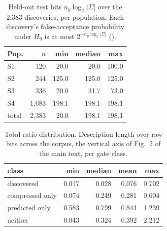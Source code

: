 \begin{table}[!ht]\centering
\caption{Held-out test bits $n_y\log_2|\Sigma|$ over the 2,383 discoveries, per population. Each discovery's false-acceptance probability under $H_0$ is at most $2^{-n_y\log_2|\Sigma|}$ ().}\label{tab:sc6}
\begin{tabular}{lrrrr}\toprule
Pop. & $n$ & min & median & max \\\midrule
S1 & 120 & 20.0 & 20.0 & 100.0 \\
S2 & 244 & 125.0 & 125.0 & 125.0 \\
S3 & 336 & 20.0 & 31.7 & 73.0 \\
S4 & 1,683 & 198.1 & 198.1 & 198.1 \\
\midrule
total & 2,383 & 20.0 & 198.1 & 198.1 \\
\bottomrule\end{tabular}\end{table}

\begin{table}[!ht]\centering
\caption{Total-ratio distribution. Description length over raw bits across the corpus, the vertical axis of Fig.~2 of the main text, per gate class.}\label{tab:sc7}
\begin{tabular}{lrrrr}\toprule
class & min & median & mean & max \\\midrule
discovered & 0.017 & 0.028 & 0.076 & 0.702 \\
compressed only & 0.074 & 0.249 & 0.281 & 0.604 \\
predicted only & 0.583 & 0.799 & 0.844 & 1.239 \\
neither & 0.043 & 0.324 & 0.392 & 2.212 \\
\bottomrule\end{tabular}\end{table}
